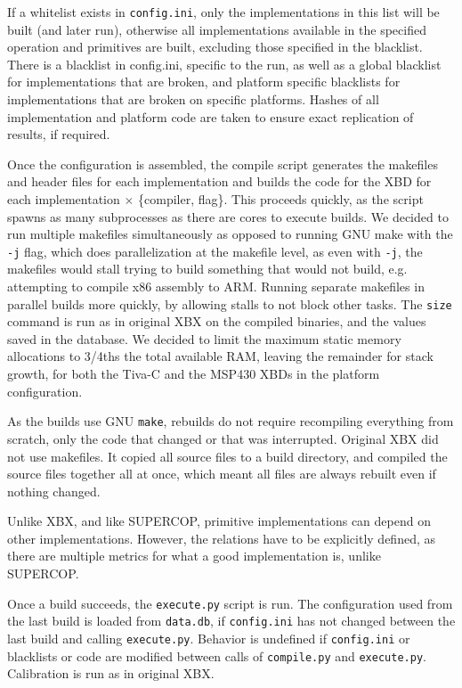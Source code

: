\documentclass[twoside,11pt]{cergdoc}
\begin{document}
If a whitelist exists in \texttt{config.ini}, only the
implementations in this list will be built (and later run), otherwise all
implementations available in the specified operation and primitives are built,
excluding those specified in the blacklist. There is a blacklist in config.ini,
specific to the run, as well as a global blacklist for implementations that are
broken, and platform specific blacklists for implementations that are broken on
specific platforms. Hashes of all implementation and platform code are taken to
ensure exact replication of results, if required.

Once the configuration is assembled, the compile script generates the makefiles
and header files for each implementation and builds the code for the XBD for
each implementation $\times$ \{compiler, flag\}. This proceeds quickly, as the
script spawns as many subprocesses as there are cores to execute builds. We
decided to run multiple makefiles simultaneously as opposed to running GNU make
with the \texttt{-j} flag, which does parallelization at the makefile level, as
even with \texttt{-j}, the makefiles would stall trying to build something that
would not build, e.g. attempting to compile x86 assembly to ARM. Running
separate makefiles in parallel builds more quickly, by allowing stalls to not
block other tasks. The \texttt{size} command is run as in original XBX on the
compiled binaries, and the values saved in the database. We decided to limit the
maximum static memory allocations to 3/4ths the total available RAM, leaving the
remainder for stack growth, for both the Tiva-C and the MSP430 XBDs in the
platform configuration.

As the builds use GNU \texttt{make}, rebuilds do not require recompiling everything from
scratch, only the code that changed or that was interrupted. Original XBX did
not use makefiles. It copied all source files to a build directory, and compiled
the source files together all at once, which meant all files are always rebuilt
even if nothing changed. 

Unlike XBX, and like SUPERCOP, primitive implementations can depend on other
implementations. However, the relations have to be explicitly defined, as there
are multiple metrics for what a good implementation is, unlike SUPERCOP.

Once a build succeeds, the \texttt{execute.py} script is run. The configuration
used from the last build is loaded from \texttt{data.db}, if \texttt{config.ini}
has not changed between the last build and calling \texttt{execute.py}. Behavior
is undefined if \texttt{config.ini} or blacklists or code are modified between
calls of \texttt{compile.py} and \texttt{execute.py}. Calibration is run as in
original XBX.
\end{document}
